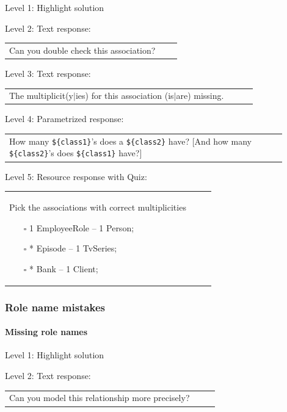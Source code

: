 \noindent Level 1: Highlight solution \medskip

\noindent Level 2: Text response: \medskip

\begin{tabular}{|p{0.9\linewidth}}
Can you double check this association?
\end{tabular} \medskip

\noindent Level 3: Text response: \medskip

\begin{tabular}{|p{0.9\linewidth}}
The multiplicit(y$|$ies) for this association (is$|$are) missing.
\end{tabular} \medskip

\noindent Level 4: Parametrized response: \medskip

\begin{tabular}{|p{0.9\linewidth}}
How many \verb|${class1}|'s does a \verb|${class2}| have? [And how many \verb|${class2}|'s does \verb|${class1}| have?]
\end{tabular} \medskip

\noindent Level 5: Resource response with Quiz: \medskip

\begin{tabular}{|p{0.9\linewidth}}
Pick the associations with correct multiplicities

\begin{itemize}
    \item[$\square$] 1 EmployeeRole -- 1 Person;
    \item[$\square$] * Episode -- 1 TvSeries;
    \item[$\square$] * Bank -- 1 Client;
\end{itemize}

\end{tabular} \medskip


\subsubsection{Role name mistakes}

\paragraph{Missing role names}

\noindent Level 1: Highlight solution \medskip

\noindent Level 2: Text response: \medskip

\begin{tabular}{|p{0.9\linewidth}}
Can you model this relationship more precisely?
\end{tabular} \medskip

